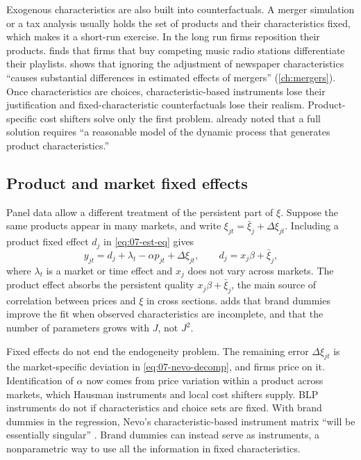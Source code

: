 Exogenous characteristics are also built into counterfactuals. A merger simulation or a tax analysis usually holds
the set of products and their characteristics fixed, which makes it a short-run exercise. In the long run firms
reposition their products. \citet{Sweeting2010} finds that firms that buy competing music radio stations
differentiate their playlists. \citet{Fan2013} shows that ignoring the adjustment of newspaper characteristics
``causes substantial differences in estimated effects of mergers'' (\cref{ch:mergers}). Once characteristics are
choices, characteristic-based instruments lose their justification and fixed-characteristic counterfactuals lose their
realism. Product-specific cost shifters solve only the first problem. \citet[p.~259]{Berry1994} already noted that a
full solution requires ``a reasonable model of the dynamic process that generates product characteristics.''

\subsection{Product and market fixed effects}\label{sec:07-fixed-effects}

Panel data allow a different treatment of the persistent part of $\xi$. Suppose the same products appear in many
markets, and write $\xi_{jt} = \bar\xi_j + \Delta\xi_{jt}$. Including a product fixed effect $d_j$ in
\eqref{eq:07-est-eq} gives
\begin{equation}\label{eq:07-fe-eq}
  y_{jt} = d_j + \lambda_t - \alpha p_{jt} + \Delta\xi_{jt}, \qquad d_j = x_j\beta + \bar\xi_j ,
\end{equation}
where $\lambda_t$ is a market or time effect and $x_j$ does not vary across markets. The product effect absorbs the
persistent quality $x_j\beta + \bar\xi_j$, the main source of correlation between prices and $\xi$ in cross sections.
\citet[p.~322]{Nevo2001} adds that brand dummies improve the fit when observed characteristics are incomplete, and that
the number of parameters grows with $J$, not $J^2$.

Fixed effects do not end the endogeneity problem. The remaining error $\Delta\xi_{jt}$ is the market-specific deviation
in \eqref{eq:07-nevo-decomp}, and firms price on it. Identification of $\alpha$ now comes from price variation within
a product across markets, which Hausman instruments and local cost shifters supply. BLP instruments do not if
characteristics and choice sets are fixed. With brand dummies in the regression, Nevo's characteristic-based
instrument matrix ``will be essentially singular'' \citep[p.~320]{Nevo2001}. Brand dummies can instead serve as
instruments, a nonparametric way to use all the information in fixed characteristics.

